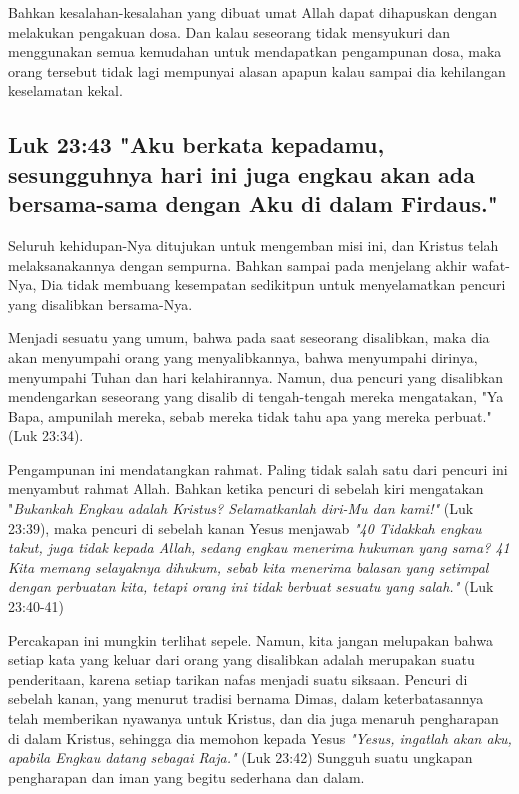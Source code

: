 Bahkan
kesalahan-kesalahan yang dibuat umat Allah dapat dihapuskan dengan melakukan
pengakuan dosa. Dan kalau seseorang tidak mensyukuri dan menggunakan semua
kemudahan untuk mendapatkan pengampunan dosa, maka orang tersebut tidak lagi
mempunyai alasan apapun kalau sampai dia kehilangan keselamatan kekal.

\subsection{Luk 23:43 "Aku berkata kepadamu, sesungguhnya hari ini juga engkau
akan ada bersama-sama dengan Aku di dalam Firdaus."}

Seluruh
kehidupan-Nya ditujukan untuk mengemban misi ini, dan Kristus telah
melaksanakannya dengan sempurna. Bahkan sampai pada menjelang akhir wafat-Nya,
Dia tidak membuang kesempatan sedikitpun untuk menyelamatkan pencuri yang
disalibkan bersama-Nya.

Menjadi sesuatu yang umum, bahwa pada saat seseorang disalibkan, maka dia akan
menyumpahi orang yang menyalibkannya, bahwa menyumpahi dirinya, menyumpahi
Tuhan dan hari kelahirannya. 
Namun, dua pencuri yang disalibkan mendengarkan
seseorang yang disalib di tengah-tengah mereka mengatakan, "Ya Bapa, ampunilah
mereka, sebab mereka tidak tahu apa yang mereka perbuat." (Luk 23:34).

Pengampunan ini mendatangkan rahmat. Paling tidak salah satu dari pencuri ini
menyambut rahmat Allah. Bahkan ketika pencuri di sebelah kiri mengatakan
"\textit{Bukankah Engkau adalah Kristus? Selamatkanlah diri-Mu dan kami!"} (Luk 23:39),
maka pencuri di sebelah kanan Yesus menjawab 
\textit{"40 Tidakkah engkau takut, juga
tidak kepada Allah, sedang engkau menerima hukuman yang sama? 41  Kita memang
selayaknya dihukum, sebab kita menerima balasan yang setimpal dengan perbuatan
kita, tetapi orang ini tidak berbuat sesuatu yang salah."} (Luk 23:40-41)

Percakapan ini mungkin terlihat sepele. Namun, kita jangan melupakan bahwa
setiap kata yang keluar dari orang yang disalibkan adalah merupakan suatu
penderitaan, karena setiap tarikan nafas menjadi suatu siksaan. Pencuri di
sebelah kanan, yang menurut tradisi bernama Dimas, dalam keterbatasannya telah
memberikan nyawanya untuk Kristus, dan dia juga menaruh pengharapan di dalam
Kristus, sehingga dia memohon kepada Yesus \textit{"Yesus, ingatlah akan aku, apabila
Engkau datang sebagai Raja."} (Luk 23:42) Sungguh suatu ungkapan pengharapan dan
iman yang begitu sederhana dan dalam. 

